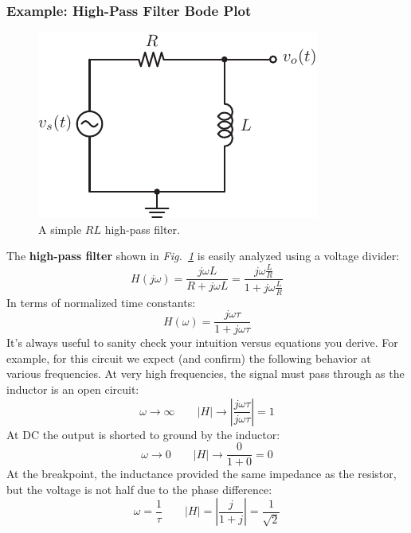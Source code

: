 \subsubsection{Example: High-Pass Filter Bode Plot}
\begin{figure}[tb]
\centering
\includegraphics[angle=-0.0,width=.4\columnwidth]{mod1_3_8_rl_hpf}
\caption{A simple $RL$ high-pass filter.}
\label{fig:hpf}
\end{figure}
The \textbf{high-pass filter} shown in \emph{Fig.~\ref{fig:hpf}}  is easily analyzed using a voltage divider:
    \begin{equation}
        H(j\omega ) = \frac{{j\omega L}}{{R + j\omega L}} = \frac{{j\omega \frac{L}{R}}}{{1 + j\omega \frac{L}{R}}}
    \end{equation}
In terms of normalized time constants:
    \begin{equation}
        H(\omega ) = \frac{{j\omega \tau }}{{1 + j\omega \tau }}
    \end{equation}
It's always useful to sanity check your intuition versus equations you derive.  For example, for this circuit we expect (and confirm) the following behavior at various frequencies.  At very high frequencies, the signal must pass through as the inductor is an open circuit:
    \begin{equation}
        \omega  \to \infty  \quad\quad  \left| H \right| \to \left| {\frac{{j\omega \tau }}{{j\omega \tau }}} \right| = 1
    \end{equation}
At DC the output is shorted to ground by the inductor:
    \begin{equation}
        \omega  \to 0  \quad\quad \left| H \right| \to \frac{0}{{1 + 0}} = 0
    \end{equation}
At the breakpoint, the inductance provided the same impedance as the resistor, but the voltage is not half due to the phase difference:
    \begin{equation}
        \omega  = \frac{1}{\tau }  \quad\quad  \left| H \right| = \left| {\frac{j}{{1 + j}}} \right| = \frac{1}{{\sqrt 2 }}
    \end{equation}
\newpage
